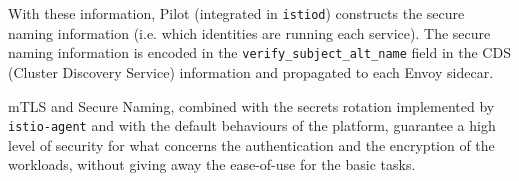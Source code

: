 With these information, Pilot (integrated in \texttt{istiod}) constructs the secure naming information (i.e. which identities are running each service). The secure naming information is encoded in the \texttt{verify\_subject\_alt\_name} field in the CDS (Cluster Discovery Service) information and propagated to each Envoy sidecar.

mTLS and Secure Naming, combined with the secrets rotation implemented by \texttt{istio-agent} and with the default behaviours of the platform, guarantee a high level of security for what concerns the authentication and the encryption of the workloads, without giving away the ease-of-use for the basic tasks.  